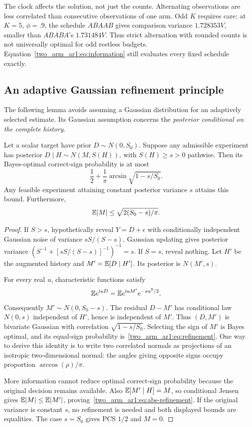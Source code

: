 The clock affects the solution, not just the counts. Alternating observations are less correlated than consecutive observations of one arm. Odd $K$ requires care: at $K=5$, $\phi=.9$, the schedule $ABAAB$ gives comparison variance $1.728353V$, smaller than $ABABA$'s $1.731484V$. Thus strict alternation with rounded counts is not universally optimal for odd restless budgets. Equation~\eqref{two_arm_ar1:eq:information} still evaluates every fixed schedule exactly.

\subsection{An adaptive Gaussian refinement principle}
The following lemma avoids assuming a Gaussian distribution for an adaptively selected estimate. Its Gaussian assumption concerns the \emph{posterior conditional on the complete history}.

\begin{lemma}
Let a scalar target have prior $D\sim N(0,S_0)$. Suppose any admissible experiment has posterior $D\mid H\sim N(M,S(H))$, with $S(H)\geq s>0$ pathwise. Then its Bayes-optimal correct-sign probability is at most
\begin{equation}
\frac12+\frac1\pi\arcsin\sqrt{1-s/S_0}.
\label{two_arm_ar1:eq:refinement}
\end{equation}
Any feasible experiment attaining constant posterior variance $s$ attains this bound. Furthermore,
\begin{equation}
\mathbb E|M|\leq\sqrt{2(S_0-s)/\pi}.
\label{two_arm_ar1:eq:abs-refinement}
\end{equation}
\end{lemma}
\begin{proof}
If $S>s$, hypothetically reveal $Y=D+\epsilon$ with conditionally independent Gaussian noise of variance $sS/(S-s)$. Gaussian updating gives posterior variance
$(S^{-1}+[sS/(S-s)]^{-1})^{-1}=s$.
If $S=s$, reveal nothing. Let $H'$ be the augmented history and $M'=\mathbb E[D\mid H']$. Its posterior is $N(M',s)$.

For every real $u$, characteristic functions satisfy
\[
\mathbb E e^{\mathrm i uD}=\mathbb E e^{\mathrm i uM'}e^{-su^2/2}.
\]
Consequently $M'\sim N(0,S_0-s)$. The residual $D-M'$ has conditional law $N(0,s)$ independent of $H'$, hence is independent of $M'$. Thus $(D,M')$ is bivariate Gaussian with correlation $\sqrt{1-s/S_0}$. Selecting the sign of $M'$ is Bayes optimal, and its equal-sign probability is~\eqref{two_arm_ar1:eq:refinement}. One way to derive this identity is to write two correlated normals as projections of an isotropic two-dimensional normal: the angles giving opposite signs occupy proportion $\arccos(\rho)/\pi$.

More information cannot reduce optimal correct-sign probability because the original decision remains available. Also $\mathbb E[M'\mid H]=M$, so conditional Jensen gives $\mathbb E|M|\leq\mathbb E|M'|$, proving~\eqref{two_arm_ar1:eq:abs-refinement}. If the original variance is constant $s$, no refinement is needed and both displayed bounds are equalities. The case $s=S_0$ gives PCS $1/2$ and $M=0$.
\end{proof}

